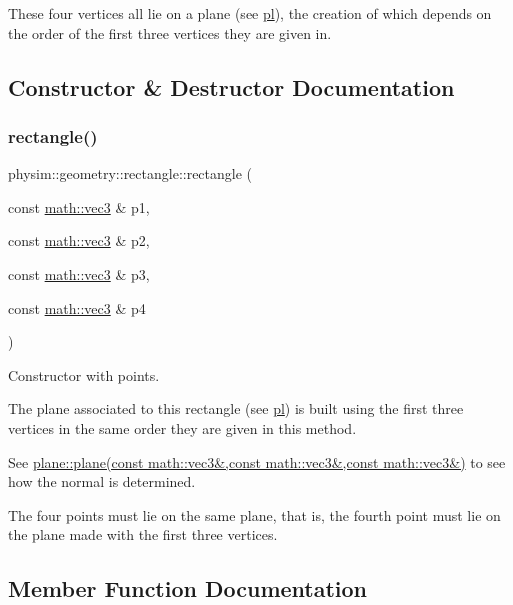 These four vertices all lie on a plane (see \hyperlink{classphysim_1_1geometry_1_1rectangle_ae31596ec13141a7dee676786f724f6e5}{pl}), the creation of which depends on the order of the first three vertices they are given in. 

\subsection{Constructor \& Destructor Documentation}
\mbox{\label{classphysim_1_1geometry_1_1rectangle_a84f8d25d2d1d25a8efde6c66cc311e49}} 
\subsubsection{\texorpdfstring{rectangle()}{rectangle()}}
{\footnotesize\ttfamily physim\+::geometry\+::rectangle\+::rectangle (\begin{DoxyParamCaption}\item[{const \hyperlink{structphysim_1_1math_1_1vec3}{math\+::vec3} \&}]{p1,  }\item[{const \hyperlink{structphysim_1_1math_1_1vec3}{math\+::vec3} \&}]{p2,  }\item[{const \hyperlink{structphysim_1_1math_1_1vec3}{math\+::vec3} \&}]{p3,  }\item[{const \hyperlink{structphysim_1_1math_1_1vec3}{math\+::vec3} \&}]{p4 }\end{DoxyParamCaption})}



Constructor with points. 

The plane associated to this rectangle (see \hyperlink{classphysim_1_1geometry_1_1rectangle_ae31596ec13141a7dee676786f724f6e5}{pl}) is built using the first three vertices in the same order they are given in this method.

See \hyperlink{classphysim_1_1geometry_1_1plane_a7ff5e0444f792d759198fb7339c9dc1a}{plane\+::plane(const math\+::vec3\&,const math\+::vec3\&,const math\+::vec3\&)} to see how the normal is determined.

The four points must lie on the same plane, that is, the fourth point must lie on the plane made with the first three vertices. 

\subsection{Member Function Documentation}
\mbox{\label{classphysim_1_1geometry_1_1rectangle_aedd73dc941859c329b59e8f76d7366a2}} 
